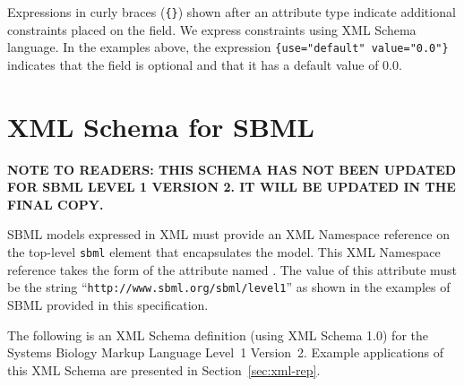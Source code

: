 \documentclass[10pt]{cekarticle}
\newcommand{\changed}[1]{\textcolor{BrickRed}{#1}}
\newenvironment{blockChanged}{\color{BrickRed}}{}
\begin{document}
Expressions in curly braces (\texttt{\{\}}) shown after an attribute type
indicate additional constraints placed on the field.  We express constraints
using XML Schema language.  In the examples above, the expression
\texttt{\{use="default" value="0.0"\}} indicates that the field 
is optional and that it has a default value of $0.0$.



\section{XML Schema for SBML}
\label{apdx:schemas}

\changed{\textbf{NOTE TO READERS: THIS SCHEMA HAS NOT BEEN UPDATED FOR SBML
    LEVEL 1 VERSION 2.  IT WILL BE UPDATED IN THE FINAL COPY.}}

\begin{blockChanged}
  SBML models expressed in XML must provide an XML Namespace reference on
  the top-level \texttt{sbml} element that encapsulates the model.  This
  XML Namespace reference takes the form of the attribute named
  .  The value of this attribute must be the string
  ``\texttt{http://www.sbml.org/sbml/level1}'' as shown in the examples of
  SBML provided in this specification.
\end{blockChanged}

The following is an XML Schema definition (using XML Schema 1.0) for the
Systems Biology Markup Language Level~1 \changed{Version~2}.  Example
applications of this XML Schema are presented in Section~\ref{sec:xml-rep}.
\end{document}
